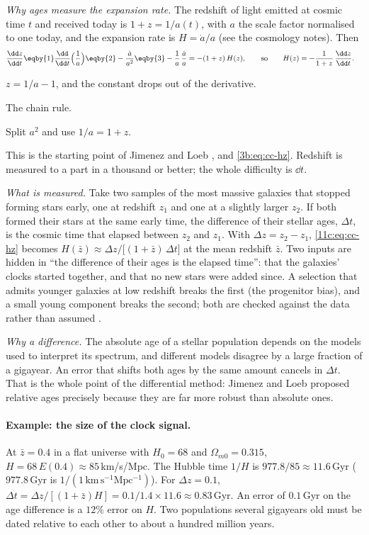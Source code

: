 \emph{Why ages measure the expansion rate.} The redshift of light emitted at cosmic
time $t$ and received today is $1+z=1/a(t)$, with $a$ the scale factor normalised to
one today, and the expansion rate is $H=\dot a/a$ (see the cosmology notes). Then
\begin{align}
  \frac{\dd z}{\dd t}
  &\eqby{1}\frac{\dd}{\dd t}\Bigl(\frac1a\Bigr)
   \eqby{2}-\frac{\dot a}{a^2}
   \eqby{3}-\frac1a\,\frac{\dot a}{a}
   =-(1+z)\,H(z),
  \qquad\text{so}\qquad
  H(z)=-\frac{1}{1+z}\,\frac{\dd z}{\dd t}.
  \label{11c:eq:cc-hz}
\end{align}
\begin{explain}
  \item $z=1/a-1$, and the constant drops out of the derivative.
  \item The chain rule.
  \item Split $a^2$ and use $1/a=1+z$.
\end{explain}
This is the starting point of Jimenez and Loeb \cite[eq.~(2)]{JimenezLoeb2002}, and
\eqref{3b:eq:cc-hz}. Redshift is measured to a part in a thousand or better; the
whole difficulty is $\dd t$.

\emph{What is measured.} Take two samples of the most massive galaxies that stopped
forming stars early, one at redshift $z_1$ and one at a slightly larger $z_2$. If
both formed their stars at the same early time, the difference of their stellar
ages, $\Delta t$, is the cosmic time that elapsed between $z_2$ and $z_1$. With
$\Delta z=z_2-z_1$, \eqref{11c:eq:cc-hz} becomes
$H(\bar z)\approx\Delta z/\bigl[(1+\bar z)\,\Delta t\bigr]$ at the mean redshift $\bar z$. Two
inputs are hidden in ``the difference of their ages is the elapsed time'': that the
galaxies' clocks started together, and that no new stars were added since. A
selection that admits younger galaxies at low redshift breaks the first (the
progenitor bias), and a small young component breaks the second; both are checked
against the data rather than assumed \cite[Sec.~3.1.4]{Moresco2022}.

\emph{Why a difference.} The absolute age of a stellar population depends on the
models used to interpret its spectrum, and different models disagree by a large
fraction of a gigayear. An error that shifts both ages by the same amount cancels in
$\Delta t$. That is the whole point of the differential method: Jimenez and Loeb
proposed relative ages precisely because they are far more robust than absolute ones.

\paragraph{Example: the size of the clock signal.} At $\bar z=0.4$ in a flat universe
with $H_0=68$ and $\Omega_{m0}=0.315$, $H=68\,E(0.4)\approx85$\,km/s/Mpc. The Hubble time
$1/H$ is $977.8/85\approx11.6$\,Gyr ($977.8$\,Gyr is $1/(1\,\mathrm{km\,s^{-1}Mpc^{-1}})$).
For $\Delta z=0.1$, $\Delta t=\Delta z/[(1+\bar z)H]=0.1/1.4\times11.6\approx0.83$\,Gyr. An error
of $0.1$\,Gyr on the age difference is a $12\%$ error on $H$. Two populations
several gigayears old must be dated relative to each other to about a hundred million
years.

